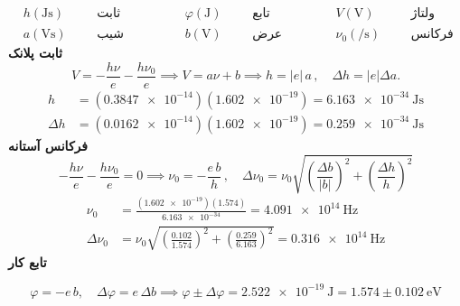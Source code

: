 \begin{equation*}
    \begin{aligned}
         & h\left(\unit{\joule\second}\right)                &  &  & \text{ثابت پلانک}
         & \quad\qquad \varphi \left(\unit{\joule}\right)    &  &  & \text{تابع کار}
         & \quad\qquad V(\unit{\volt})                       &  &  & \text{ولتاژ معکوس}
        \\
         & a \left(\unit{\volt\second}\right)                &  &  & \text{شیب برازش}
         & \quad\qquad b \left(\unit{\volt}\right)           &  &  & \text{عرض از مبدا}
         & \quad\qquad \nu_0 \left(\unit{\per\second}\right) &  &  & \text{فرکانس آستانه}
    \end{aligned}
\end{equation*}
\vspace{0.2cm}
\noindent\textbf{ثابت پلانک}
\vspace{-0.4cm}
\begin{equation*}
    V = -\frac{h \nu}{e} - \frac{h \nu_0}{e} \implies
    V = a \nu + b \implies
    h =  |e| \,a \,, \quad \Delta h = |e| \Delta a.
\end{equation*}
\vspace{-1.4cm}
\begin{align*}
    h        & = (\num{0.3847e-14})(\num{1.602e-19}) = \qty{6.163e-34}{\joule\second} \\
    \Delta h & = (\num{0.0162e-14})(\num{1.602e-19}) = \qty{0.259e-34}{\joule\second}
\end{align*}
\noindent\textbf{فرکانس آستانه}
\begin{equation*}
    - \frac{h \nu}{e} - \frac{h \nu_0}{e} = 0 \implies
    \nu_0 = - \frac{e\,b}{h}\, , \quad \Delta \nu_0 = \nu_0 \sqrt{\left(\frac{\Delta b}{|{b}|}\right)^2 + \left(\frac{\Delta h}{h}\right)^2}
\end{equation*}
\vspace{-0.6cm}
\begin{align*}
    \nu_0        & = \frac{(\num{1.602e-19})(1.574)}{\num{6.163e-34}} = \qty{4.091e14}{\hertz}                                    \\[0.2cm]
    \Delta \nu_0 & = \nu_0\sqrt{\left(\frac{0.102}{1.574}\right)^2 + \left(\frac{0.259}{6.163}\right)^2} = \qty{0.316e14}{\hertz}
\end{align*}
\noindent\textbf{تابع کار}

\begin{equation*}
    \varphi = -e\,b, \quad \Delta\varphi = e\,\Delta b \implies \varphi \pm \Delta\varphi = \qty{2.522 e-19}{\joule} = 1.574\pm 0.102 \ \unit{\electronvolt}
\end{equation*}


